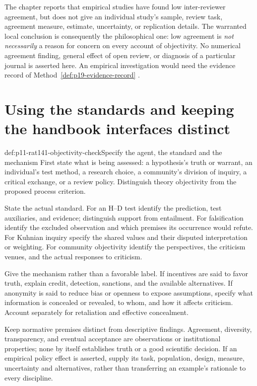The chapter reports that empirical studies have found low
inter-reviewer agreement, but does not give an individual study's
sample, review task, agreement measure, estimate, uncertainty, or
replication details. The warranted local conclusion is consequently
the philosophical one: low agreement is \emph{not necessarily} a
reason for concern on every account of objectivity. No numerical
agreement finding, general effect of open review, or diagnosis of a
particular journal is asserted here. An empirical investigation would
need the evidence record of Method~\ref{def:p19-evidence-record}
\parencite[pp.~752--753]{AndersenAndersen2021Scientific}.

\section{Using the standards and keeping the handbook interfaces distinct}
\label{sec:p11-rat141-use}

\begin{hbmethod}{def:p11-rat141-objectivity-check}{Specify the agent, the standard and the mechanism}
First state what is being assessed: a hypothesis's truth or warrant,
an individual's test method, a research choice, a community's division
of inquiry, a critical exchange, or a review policy. Distinguish
theory objectivity from the proposed process criterion.

State the actual standard. For an H--D test identify the prediction,
test auxiliaries, and evidence; distinguish support from entailment.
For falsification identify the excluded observation and which premises
its occurrence would refute. For Kuhnian inquiry specify the shared
values and their disputed interpretation or weighting. For community
objectivity identify the perspectives, the criticism venues, and
the actual responses to criticism.

Give the mechanism rather than a favorable label. If incentives are
said to favor truth, explain credit, detection, sanctions, and the
available alternatives. If anonymity is said to reduce bias or openness
to expose assumptions, specify what information is concealed or
revealed, to whom, and how it affects criticism. Account separately
for retaliation and effective concealment.

Keep normative premises distinct from descriptive findings. Agreement,
diversity, transparency, and eventual acceptance are observations or
institutional properties; none by itself establishes truth or a good
scientific decision. If an empirical policy effect is asserted, supply
its task, population, design, measure, uncertainty and alternatives,
rather than transferring an example's rationale to every discipline.
\end{hbmethod}

